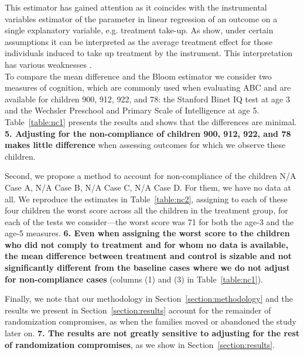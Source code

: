 \begin{appendices}
\noindent This estimator has gained attention as it coincides with the instrumental variables estimator of the parameter in linear regression of an outcome on a single explanatory variable, e.g. treatment take-up. As \citet{Angrist_Imbens_ea_1996_JASA} show, under certain assumptions it can be interpreted as the average treatment effect for those individuals induced to take up treatment by the instrument. This interpretation has various weaknesses \citep{Heckman_Urzua_etal_2006_REStat,Heckman_Urzua_2010_JoE}.\\

\noindent To compare the mean difference and the Bloom estimator we consider two measures of cognition, which are commonly used when evaluating ABC and are available for children 900, 912, 922, and 78: the Stanford Binet IQ test at age 3 and the Wechsler Preschool and Primary Scale of Intelligence at age 5. Table~\ref{table:nc1} presents the results and shows that the differences are minimal. \textbf{5. Adjusting for the non-compliance of children 900, 912, 922, and 78 makes little difference} when assessing outcomes for which we observe these children. 



\noindent Second, we propose a method to account for non-compliance of the children N/A Case A, N/A Case B, N/A Case C, N/A Case D. For them, we have no data at all. We reproduce the estimates in Table~\ref{table:nc2}, assigning to each of these four children the worst score across all the children in the treatment group, for each of the tests we consider---the worst score was 71 for both the age-3 and the age-5 measures. \textbf{6. Even when assigning the worst score to the children who did not comply to treatment and for whom no data is available, the mean difference between treatment and control is sizable and not significantly different from the baseline cases where we do not adjust for non-compliance cases} (columns (1) and (3) in Table~\ref{table:nc1}).



\noindent Finally, we note that our methodology in Section~\ref{section:methodology} and the results we present in Section~\ref{section:results} account for the remainder of randomization compromises, as when the families moved or abandoned the study later on. \textbf{7. The results are not greatly sensitive to adjusting for the rest of randomization compromises}, as we show in Section~\ref{section:results}.

\end{appendices}

\renewcommand{\refname}{Appendix References}
\clearpage
\singlespace



 